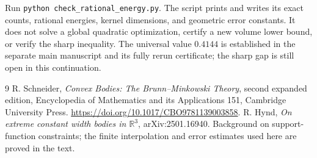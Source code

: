\documentclass[11pt]{article}
\theoremstyle{remark}\newtheorem{remark}[theorem]{Remark}
\newcommand{\R}{\mathbb R}
\numberwithin{equation}{section}
\begin{document}
Run \texttt{python check\_rational\_energy.py}. The script prints and writes
its exact counts, rational energies, kernel dimensions, and geometric error
constants. It does not solve a global quadratic optimization, certify a new
volume lower bound, or verify the sharp inequality. The universal value
$0.4144$ is established in the separate main manuscript and its fully rerun
certificate; the sharp gap is still open in this continuation.

\begin{thebibliography}{9}\small
{} R. Schneider, \emph{Convex Bodies: The Brunn--Minkowski
Theory}, second expanded edition, Encyclopedia of Mathematics and its
Applications 151, Cambridge University Press.
\url{https://doi.org/10.1017/CBO9781139003858}.
 R. Hynd, \emph{On extreme constant width bodies in $\R^3$},
arXiv:2501.16940. Background on support-function constraints; the finite
interpolation and error estimates used here are proved in the text.
\end{thebibliography}
\end{document}
